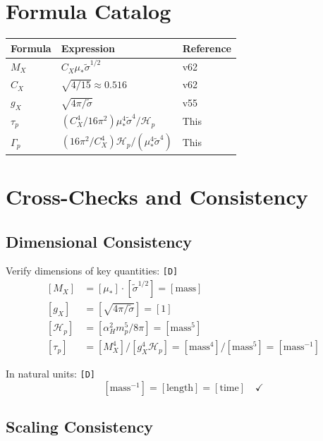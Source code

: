 \documentclass[11pt,a4paper]{article}
\newcommand{\tagD}{\textcolor{green!50!black}{\texttt{[D]}}}
\theoremstyle{definition}
\begin{document}
\section{Formula Catalog}
\label{app:formulas}

\begin{center}
\begin{tabular}{lll}
\toprule
Formula & Expression & Reference \\
\midrule
$M_X$ & $C_X \mu_* \tilde{\sigma}^{1/2}$ & v62 \\
$C_X$ & $\sqrt{4/15} \approx 0.516$ & v62 \\
$g_X$ & $\sqrt{4\pi/\tilde{\sigma}}$ & v55 \\
$\tau_p$ & $(C_X^4/16\pi^2) \mu_*^4 \tilde{\sigma}^4 / \mathcal{H}_p$ & This \\
$\Gamma_p$ & $(16\pi^2/C_X^4) \mathcal{H}_p / (\mu_*^4 \tilde{\sigma}^4)$ & This \\
\bottomrule
\end{tabular}
\end{center}

\section{Cross-Checks and Consistency}
\label{app:consistency}

\subsection{Dimensional Consistency}
\label{app:dim-consistency}

Verify dimensions of key quantities: \tagD{}
\begin{align}
\label{eq:dim-mx}
[M_X] &= [\mu_*] \cdot [\tilde{\sigma}^{1/2}] = [\text{mass}] \\
\label{eq:dim-gx}
[g_X] &= [\sqrt{4\pi/\tilde{\sigma}}] = [1] \\
\label{eq:dim-hp}
[\mathcal{H}_p] &= [\alpha_H^2 m_p^5 / 8\pi] = [\text{mass}^5] \\
\label{eq:dim-taup}
[\tau_p] &= [M_X^4] / [g_X^4 \mathcal{H}_p] = [\text{mass}^4] / [\text{mass}^5] = [\text{mass}^{-1}]
\end{align}

In natural units: \tagD{}
\begin{equation}
\label{eq:natural-units}
[\text{mass}^{-1}] = [\text{length}] = [\text{time}] \quad \checkmark
\end{equation}

\subsection{Scaling Consistency}
\label{app:scaling-consistency}
\end{document}
